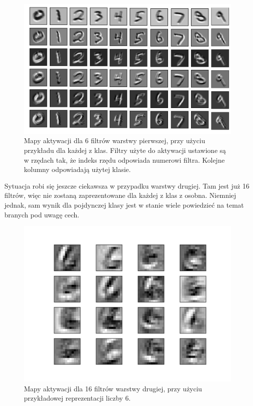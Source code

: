 \begin{figure}[ht]
\centerline{\includegraphics[scale=0.25]{resources/first_layer_gd_lenet.png}}
\caption{Mapy aktywacji dla 6 filtrów warstwy pierwszej, przy użyciu przykładu dla każdej z klas. Filtry użyte do aktywacji ustawione są w rzędach tak, że indeks rzędu odpowiada numerowi filtra. Kolejne kolumny odpowiadają użytej klasie. }
\label{fig:lenet5-mapy-aktywacji-l1}
\end{figure}

Sytuacja robi się jeszcze ciekawsza w przypadku warstwy drugiej. Tam jest już 16 filtrów, więc nie zostaną zaprezentowane dla każdej z klas z osobna. Niemniej jednak, sam wynik dla pojdynczej klasy jest w stanie wiele powiedzieć na temat branych pod uwagę cech.

\begin{figure}[ht]
\centerline{\includegraphics[scale=0.75]{resources/second_layer_gd_lenet.png}}
\caption{Mapy aktywacji dla 16 filtrów warstwy drugiej, przy użyciu przykładowej reprezentacji liczby 6.}
\label{fig:lenet5-mapy-aktywacji-l2}
\end{figure}

